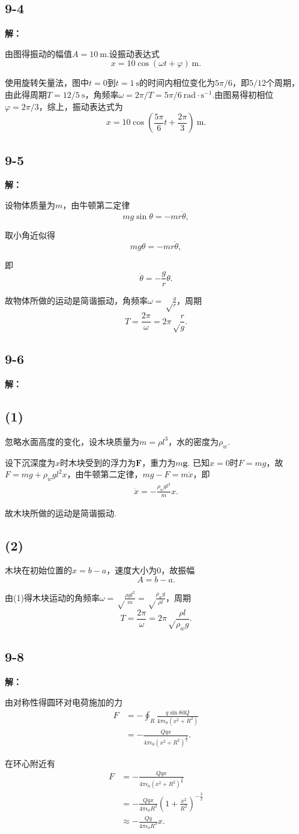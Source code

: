 \documentclass[twocolumn]{ctexart}
\newcommand{\sol}[1]{\subsection*{#1}\noindent\textbf{解：}
	
}
\begin{document}
\sol{9-4}
由图得振动的幅值$A=10\ \mathrm m$.设振动表达式
$$x=10\cos\left(\omega t+\varphi\right)\ \mathrm m.$$

使用旋转矢量法，图中$t=0$到$t=1\ \mathrm s$的时间内相位变化为$5\pi/6$，即$5/12$个周期，由此得周期$T=12/5\ \mathrm s$，角频率$\omega=2\pi/T=5\pi/6\ \mathrm{rad\cdot s^{-1}}$.由图易得初相位$\varphi=2\pi/3$，综上，振动表达式为
$$x=10\cos\left(\frac{5\pi}{6} t+\frac{2\pi}{3}\right)\ \mathrm m.$$

\sol{9-5}

设物体质量为$m$，由牛顿第二定律
$$mg\sin\theta=-mr\ddot\theta,$$

取小角近似得
$$mg\theta=-mr\ddot\theta,$$

即$$\ddot\theta=-\frac{g}{r}\theta.$$

故物体所做的运动是简谐振动，角频率$\omega=\sqrt\frac{g}{r}$，周期
$$T=\frac{2\pi}{\omega}=2\pi\sqrt\frac{r}{g}.$$

\sol{9-6}
\subsection*{(1)}
忽略水面高度的变化，设木块质量为$m=\rho l^3$，水的密度为$\rho_w$.

设下沉深度为$x$时木块受到的浮力为$\mathbf F$，重力为$m\mathbf g$. 已知$x=0$时$F=mg$，故$F=mg+\rho_w gl^2x$，由牛顿第二定律，$mg-F=m\ddot x$，即
\setcounter{equation}{0}
\begin{align}\ddot x=-\frac{\rho_w gl^2}{m}x.\end{align}

故木块所做的运动是简谐振动.
\subsection*{(2)}
木块在初始位置的$x=b-a$，速度大小为$0$，故振幅
$$A=b-a.$$

由(1)得木块运动的角频率$\omega=\sqrt\frac{\rho gl^2}{m}=\sqrt\frac{\rho_wg}{\rho l}$，周期
$$T=\frac{2\pi}{\omega}=2\pi\sqrt\frac{\rho l}{\rho_w g}.$$

\sol{9-8}

由对称性得圆环对电荷施加的力
\begin{align*}
	F&=-\oint_R\frac{q\sin\theta\mathrm dQ}{4\pi\epsilon_0\left(x^2+R^2\right)}\\
	&=-\frac{Qqx}{4\pi\epsilon_0 \left(x^2+R^2\right)^\frac{3}{2}}.
\end{align*}

在环心附近有
\begin{align*}
	F&=-\frac{Qqx}{4\pi\epsilon_0 \left(x^2+R^2\right)^\frac{3}{2}}\\
	&=-\frac{Qqx}{4\pi\epsilon_0R^3}\left(1+\frac{x^2}{R^2}\right)^{-\frac{3}{2}}\\
	&\approx-\frac{Qq}{4\pi\epsilon_0R^3}x.
\end{align*}
\end{document}
